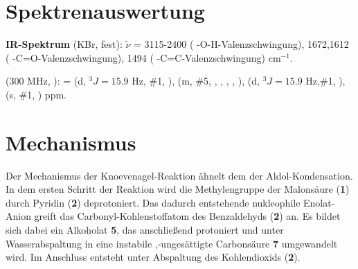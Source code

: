 \documentclass[12pt]{article}
\begin{document}
\begin{onehalfspace}
\section{Spektrenauswertung} 
\textbf{IR-Spektrum} (KBr, fest): $\tilde{\nu}$ = 3115-2400 ( -O-H-Valenzschwingung), 1672,1612 ( -C=O-Valenzschwingung), 1494 ( -C=C-Valenzschwingung) cm$^{-1}$.\\

\begin{experimental}[format=\bfseries,delta=(ppm),list=true,use-equal,pos-number = side]
\begin{minipage}[b]{0.65\textwidth} 
\NMR* (300 \si{\MHz}, ): \chemdelta =  (d, $^{3\!}J = 15.9$ \si{\Hz}, \#{1}, ),
 (m, \#{5}, , , , , ),
 (d, $^{3\!}J = 15.9$ \si{\Hz},\#{1}, ),
 (s, \#{1}, )
 ppm.
\end{minipage}
 \hfill
\begin{minipage}[t][][b]{0.40\textwidth} 
\end{minipage}
\end{experimental}
\section{Mechanismus\cite{bio}}
Der Mechanismus der Knoevenagel-Reaktion ähnelt dem der Aldol-Kondensation. In dem ersten Schritt der Reaktion wird die Methylengruppe der Malonsäure (\textbf{1}) 
durch Pyridin (\textbf{2}) deprotoniert. Das dadurch entstehende nukleophile Enolat-Anion greift das Carbonyl-Kohlenstoffatom des Benzaldehyds (\textbf{2}) an. Es bildet sich dabei ein Alkoholat \textbf{5}, das anschließend protoniert und unter Wasserabspaltung in eine instabile \chemalpha,\chembeta -ungesättigte Carbonsäure \textbf{7} umgewandelt wird. Im Anschluss entsteht unter Abspaltung des Kohlendioxids   (\textbf{2}).


\end{onehalfspace}
\end{document}
